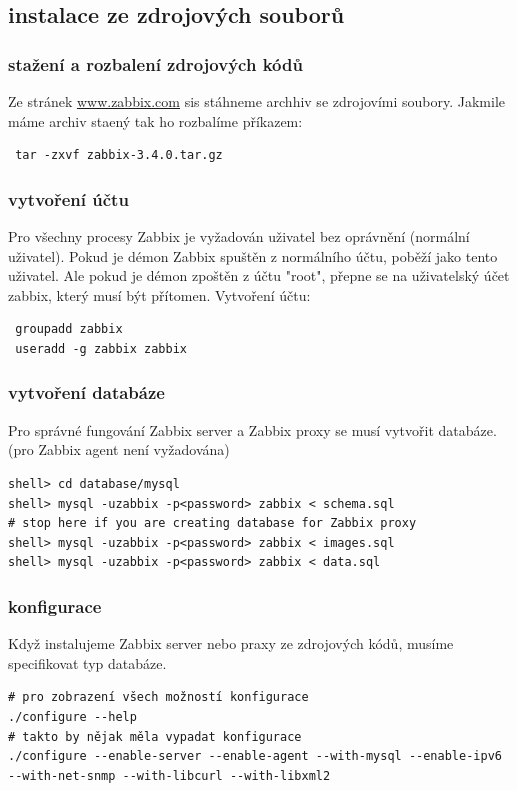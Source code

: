 \documentclass{article}
\begin{document}
\subsection{instalace ze zdrojových souborů}
\subsubsection{stažení a rozbalení zdrojových kódů}
Ze stránek \url{www.zabbix.com} sis stáhneme archhiv se zdrojovími soubory. Jakmile máme archiv staený tak ho rozbalíme příkazem:
\begin{verbatim}
 tar -zxvf zabbix-3.4.0.tar.gz
\end{verbatim}
\subsubsection{vytvoření účtu}
Pro všechny procesy Zabbix je vyžadován uživatel bez oprávnění (normální uživatel). Pokud je démon Zabbix spuštěn z normálního účtu, poběží jako tento uživatel.
\newline
Ale pokud je démon zpoštěn z účtu "root", přepne se na uživatelský účet zabbix, který musí být přítomen. Vytvoření účtu:
\begin{verbatim}
 groupadd zabbix
 useradd -g zabbix zabbix
\end{verbatim}
\subsubsection{ vytvoření databáze}
Pro správné fungování Zabbix server a Zabbix proxy se musí vytvořit databáze. (pro Zabbix agent není vyžadována)
\begin{verbatim}
shell> cd database/mysql
shell> mysql -uzabbix -p<password> zabbix < schema.sql
# stop here if you are creating database for Zabbix proxy
shell> mysql -uzabbix -p<password> zabbix < images.sql
shell> mysql -uzabbix -p<password> zabbix < data.sql
\end{verbatim}
\subsubsection{konfigurace}
Když instalujeme Zabbix server nebo praxy ze zdrojových kódů, musíme specifikovat typ databáze.
\begin{verbatim}
# pro zobrazení všech možností konfigurace
./configure --help
# takto by nějak měla vypadat konfigurace
./configure --enable-server --enable-agent --with-mysql --enable-ipv6 --with-net-snmp --with-libcurl --with-libxml2
\end{verbatim}
\end{document}
